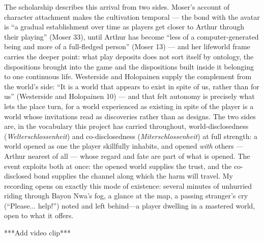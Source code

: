 The scholarship describes this arrival from two sides. Moser's account of character attachment makes the cultivation temporal — the bond with the avatar is ``a gradual establishment over time as players get closer to Arthur through their playing'' (Moser 33), until Arthur has become ``less of a computer-generated being and more of a full-fledged person'' (Moser 13) — and her lifeworld frame carries the deeper point: what play deposits does not sort itself by ontology, the dispositions brought into the game and the dispositions built inside it belonging to one continuous life. Westerside and Holopainen supply the complement from the world's side: ``It is a world that appears to exist in spite of us, rather than for us'' (Westerside and Holopainen 10) — and that felt autonomy is precisely what lets the place turn, for a world experienced as existing in spite of the player is a world whose invitations read as discoveries rather than as designs. The two sides are, in the vocabulary this project has carried throughout, world-disclosedness (\textit{Welterschlossenheit}) and co-disclosedness (\textit{Miterschlossenheit}) at full strength: a world opened as one the player skillfully inhabits, and opened \textit{with} others — Arthur nearest of all — whose regard and fate are part of what is opened. The event exploits both at once: the opened world supplies the trust, and the co-disclosed bond supplies the channel along which the harm will travel. My recording opens on exactly this mode of existence: several minutes of unhurried riding through Bayou Nwa's fog, a glance at the map, a passing stranger's cry (``Please... help!'') noted and left behind---a player dwelling in a mastered world, open to what it offers.

***Add video clip***

